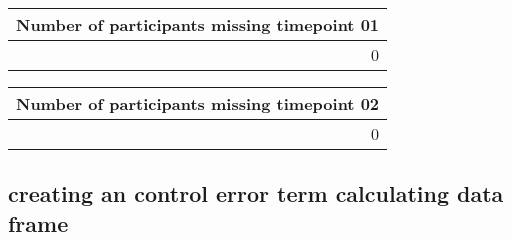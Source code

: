\documentclass[]{article}
\newenvironment{Shaded}{\begin{snugshade}}{\end{snugshade}}
\newcommand{\KeywordTok}[1]{\textcolor[rgb]{0.13,0.29,0.53}{\textbf{#1}}}
\newcommand{\DataTypeTok}[1]{\textcolor[rgb]{0.13,0.29,0.53}{#1}}
\newcommand{\DecValTok}[1]{\textcolor[rgb]{0.00,0.00,0.81}{#1}}
\newcommand{\StringTok}[1]{\textcolor[rgb]{0.31,0.60,0.02}{#1}}
\newcommand{\OperatorTok}[1]{\textcolor[rgb]{0.81,0.36,0.00}{\textbf{#1}}}
\newcommand{\NormalTok}[1]{#1}
\theoremstyle{definition}
\theoremstyle{definition}
\theoremstyle{definition}
\theoremstyle{remark}
\begin{document}
\begin{tabular}{r}
\hline
Number of participants missing timepoint 01\\
\hline
0\\
\hline
\end{tabular}

\begin{Shaded}
\end{Shaded}

\begin{tabular}{r}
\hline
Number of participants missing timepoint 02\\
\hline
0\\
\hline
\end{tabular}

\subsection{creating an control error term calculating data
frame}\label{creating-an-control-error-term-calculating-data-frame}
\end{document}
